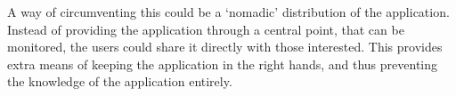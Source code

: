 A way of circumventing this could be a `nomadic' distribution of the application.
Instead of providing the application through a central point, that can be monitored, the users could share it directly with those interested.
This provides extra means of keeping the application in the right hands, and thus preventing the knowledge of the application entirely.  
